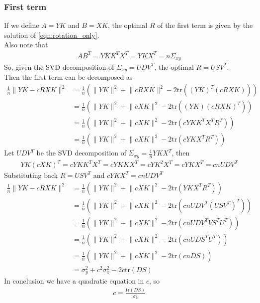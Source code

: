 \documentclass{report}
\begin{document}
\subsubsection{First term}
If we define $A=YK$ and $B=XK$, the optimal $R$ of the first term is given by the solution of \ref{eqn:rotation_only}. \\
Also note that 
\begin{align}
    AB^T = YKK^TX^T = YKX^T = n\Sigma_{xy}
\end{align}
\noindent So, given the SVD decomposition of $\Sigma_{xy} = UDV^T$, the optimal $R=USV^T$. \\
Then the first term can be decomposed as 
\begin{align}
    \frac{1}{n} \lVert YK - cRXK \rVert^2 
    &= \frac{1}{n} \left( \lVert YK \rVert^2 + \lVert cRXK \rVert^2  - 2 \text{tr}((YK)^T(cRXK))\right) \\
    &= \frac{1}{n} \left( \lVert YK \rVert^2 + \lVert cXK \rVert^2  - 2 \text{tr}((YK)(cRXK)^T)\right) \\
    &= \frac{1}{n} \left( \lVert YK \rVert^2 + \lVert cXK \rVert^2  - 2 \text{tr}(cYKK^TX^TR^T)\right) \\ 
    &= \frac{1}{n} \left( \lVert YK \rVert^2 + \lVert cXK \rVert^2  - 2 \text{tr}(cYKX^TR^T)\right) 
\end{align}
Let $UDV^T$ be the SVD decomposition of $\Sigma_{xy}=\frac{1}{n}YKX^T$, then
\begin{align}
    YK(cXK)^T = cYKK^TX^T = cYKKX^T = cYK^2X^T = cYKX^T = cnUDV^T
\end{align}
Substituting back $R=USV^T$ and $cYKX^T = cnUDV^T$
\begin{align}
    \frac{1}{n} \lVert YK - cRXK \rVert^2 
    &= \frac{1}{n} \left( \lVert YK \rVert^2 + \lVert cXK \rVert^2  - 2\text{tr}(YKX^TR^T)\right)\\
    &= \frac{1}{n} \left( \lVert YK \rVert^2 + \lVert cXK \rVert^2  - 2\text{tr}(cnUDV^T(USV^T)^T)\right)\\
    &= \frac{1}{n} \left( \lVert YK \rVert^2 + \lVert cXK \rVert^2  - 2\text{tr}(cnUDV^TVS^TU^T)\right)\\
    &= \frac{1}{n} \left( \lVert YK \rVert^2 + \lVert cXK \rVert^2  - 2\text{tr}(cnUDS^TU^T)\right)\\
    &= \frac{1}{n} \left( \lVert YK \rVert^2 + \lVert cXK \rVert^2  - 2\text{tr}(cnDS)\right)\\
    &= \sigma^2_y + c^2 \sigma^2_x - 2c\text{tr}(DS)
\end{align}
In conclusion we have a quadratic equation in $c$, so
\begin{align}
    c = \frac{\text{tr}(DS)}{\sigma^2_x}
\end{align}
\end{document}
